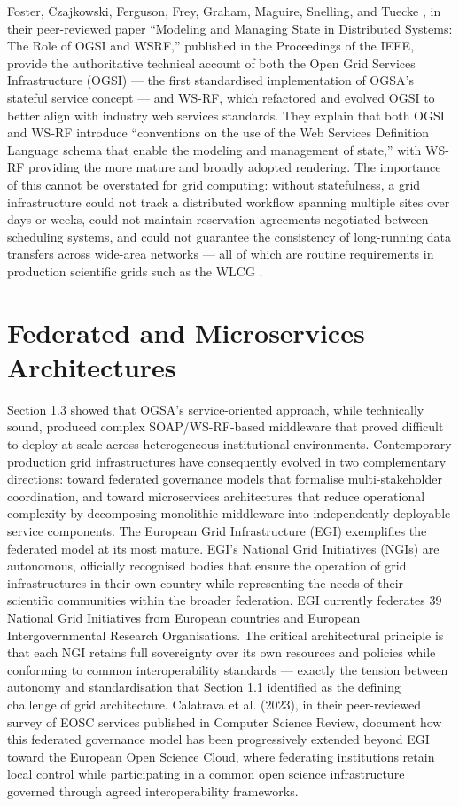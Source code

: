 \documentclass[12pt,a4paper]{report}
\begin{document}
   Foster, Czajkowski, Ferguson, Frey, Graham, Maguire, Snelling, and Tuecke \parencite{foster2005modeling}, in their peer-reviewed paper 
   “Modeling and Managing State in Distributed Systems: The Role of OGSI and WSRF,” published in the Proceedings of the IEEE, provide the authoritative 
   technical account of both the Open Grid Services Infrastructure (OGSI) — the first standardised implementation of OGSA’s stateful service 
   concept — and WS-RF, which refactored and evolved OGSI to better align with industry web services standards. They explain that both OGSI
    and WS-RF introduce “conventions on the use of the Web Services Definition Language schema that enable the modeling and management of state,” 
    with WS-RF providing the more mature and broadly adopted rendering. The importance of this cannot be overstated for grid computing: without 
    statefulness, a grid infrastructure could not track a distributed workflow spanning multiple sites over days or weeks, could not maintain 
    reservation agreements negotiated between scheduling systems, and could not guarantee the consistency of long-running data transfers across
     wide-area networks — all of which are routine requirements in production scientific grids such as the WLCG \parencite{grigoryeva2024}.

\section*{Federated and Microservices Architectures}
Section 1.3 showed that OGSA’s service-oriented approach, while technically sound, produced complex SOAP/WS-RF-based middleware that proved 
difficult to deploy at scale across heterogeneous institutional environments. Contemporary production grid infrastructures have consequently 
evolved in two complementary directions: toward federated governance models that formalise multi-stakeholder coordination, and toward
 microservices architectures that reduce operational complexity by decomposing monolithic middleware into independently deployable service 
 components. The European Grid Infrastructure (EGI) exemplifies the federated model at its most mature. EGI’s National Grid Initiatives 
 (NGIs) are autonomous, officially recognised bodies that ensure the operation of grid infrastructures in their own country while representing
  the needs of their scientific communities within the broader federation. EGI currently federates 39 National Grid Initiatives from European 
  countries and European Intergovernmental Research Organisations. The critical architectural principle is that each NGI retains full sovereignty 
  over its own resources and policies while conforming to common interoperability standards — exactly the tension between autonomy and standardisation
   that Section 1.1 identified as the defining challenge of grid architecture. Calatrava et al. (2023), in their peer-reviewed survey of EOSC services
    published in Computer Science Review, document how this federated governance model has been progressively extended beyond EGI toward the European 
    Open Science Cloud, where federating institutions retain local control while participating in a common open science infrastructure governed through
     agreed interoperability frameworks.
\end{document}
